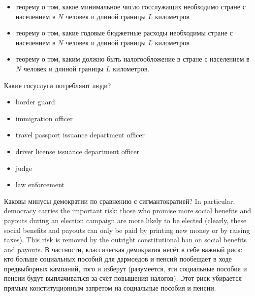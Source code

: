 \documentclass[11pt]{article}
\theoremstyle{remark}
\theoremstyle{definition}
\begin{document}
\begin{itemize}
\item теорему о том, какое минимальное число госслужащих необходимо стране с населением в $N$ человек и длиной границы $L$ километров
\item теорему о том, какие годовые бюджетные расходы необходимы стране с населением в $N$ человек и длиной границы $L$ километров
\item теорему о том, каким должно быть налогообложение в стране с населением в $N$ человек и длиной границы $L$ километров.
\end{itemize}



Какие госуслуги потребляют люди?



\begin{itemize}
\item border guard
\item immigration officer
\item travel passport issuance department officer
\item driver license issuance department officer
\item judge
\item law enforcement
\end{itemize}







Каковы минусы демократии по сравнению с сигмантократией? In particular, democracy carries the important risk: those who promise more social benefits and payouts during an election campaign are more likely to be elected (clearly, these social benefits and payouts can only be paid by printing new money or by raising taxes). This risk is removed by the outright constitutional ban on social benefits and payouts. В частности, классическая демократия несёт в себе важный риск: кто больше социальных пособий для дармоедов и пенсий пообещает в ходе предвыборных кампаний, того и изберут (разумеется, эти социальные пособия и пенсии будут выплачиваться за счёт повышения налогов). Этот риск убирается прямым конституционным запретом на социальные пособия и пенсии.
\end{document}

